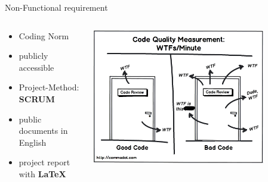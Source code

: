 \documentclass[
    ngerman,%
    authorontitle=true,
]{bfhbeamer}
\begin{document}
    \begin{frame}{Non-Functional requirement}
        \begin{columns} %
            \begin{column}{0.5\textwidth} %
                \begin{itemize}
                    \item Coding Norm
                    \item publicly accessible
                    \item Project-Method: \textbf{SCRUM}
                    \item public documents in English
                    \item project report with \textbf{LaTeX}
                \end{itemize}
            \end{column}
            \begin{column}{0.4\textwidth} %
                \begin{center}
                    \includegraphics[width=0.8\textwidth]{pictures/clean-code-1}
                \end{center}
            \end{column}
        \end{columns}
    \end{frame}
\end{document}
